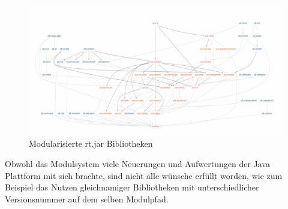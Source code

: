     \begin{figure}[h!]
      \centering{}
      \includegraphics[width=\textwidth]{material/images/jdk.png}
      \caption{Modularisierte rt.jar Bibliotheken}
      \label{fig:jdk}
  \end{figure}

  Obwohl das Modulsystem viele Neuerungen und Aufwertungen der Java Plattform mit sich brachte, sind nicht alle wünsche erfüllt worden, wie zum Beispiel das Nutzen gleichnamiger Bibliotheken mit unterschiedlicher Versionsnummer auf dem selben Modulpfad.
 

